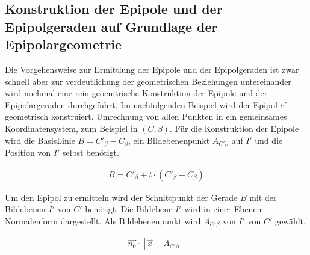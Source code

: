 \subsection{Konstruktion der Epipole und der Epipolgeraden auf Grundlage der Epipolargeometrie}


Die Vorgehensweise zur Ermittlung der Epipole und der Epipolgeraden ist zwar schnell aber zur verdeutlichung der geometrischen Beziehungen untereinander wird nochmal eine rein geoemtrische Konstruktion der Epipole und der Epipolargeraden durchgeführt. Im nachfolgenden Beispiel wird der Epipol \ensuremath{e'} geometrisch konstruiert. Umrechnung von allen Punkten in ein gemeinsames Koordinatensystem, zum Beispiel in $(C,\beta)$. Für die Konstruktion der Epipole wird die BasisLinie $B = C'_\beta - C_\beta$, ein Bildebenenpunkt $A_{C'\beta}$ auf $I'$ und die Position von $I'$ selbst benötigt.


\begin{gather}
B = C'_\beta + t\cdot (C'_\beta-C_\beta)
\end{gather}

Um den Epipol zu ermitteln wird der Schnittpunkt der Gerade $B$ mit der Bildebenen $I'$ von $C'$ benötigt. Die Bildebene $I'$ wird in einer Ebenen Normalenform dargestellt. Als Bildebenenpunkt wird $A_{C'\beta}$ von $I'$ von $C'$ gewählt.


\begin{gather}
\vec{n_0}\cdot[\vec{x}-A_{C'\beta}]
\end{gather}


